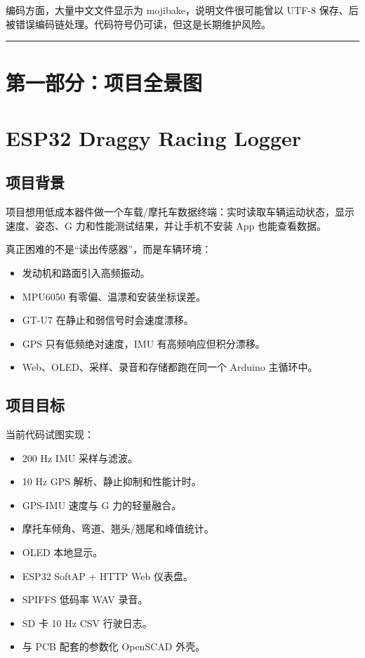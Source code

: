 \documentclass[
  UTF8,11pt,a4paper]{ctexart}
\providecommand{\tightlist}{%
  \setlength{\itemsep}{0pt}\setlength{\parskip}{0pt}}
\begin{document}
编码方面，大量中文文件显示为 mojibake，说明文件很可能曾以 UTF-8
保存、后被错误编码链处理。代码符号仍可读，但这是长期维护风险。

\begin{center}\rule{0.5\linewidth}{0.5pt}\end{center}

\section{第一部分：项目全景图}\label{ux7b2cux4e00ux90e8ux5206ux9879ux76eeux5168ux666fux56fe}

\section{ESP32 Draggy Racing Logger}\label{esp32-draggy-racing-logger}

\subsection{项目背景}\label{ux9879ux76eeux80ccux666f}

项目想用低成本器件做一个车载/摩托车数据终端：实时读取车辆运动状态，显示速度、姿态、G
力和性能测试结果，并让手机不安装 App 也能查看数据。

真正困难的不是``读出传感器''，而是车辆环境：

\begin{itemize}
\tightlist
\item
  发动机和路面引入高频振动。
\item
  MPU6050 有零偏、温漂和安装坐标误差。
\item
  GT-U7 在静止和弱信号时会速度漂移。
\item
  GPS 只有低频绝对速度，IMU 有高频响应但积分漂移。
\item
  Web、OLED、采样、录音和存储都跑在同一个 Arduino 主循环中。
\end{itemize}

\subsection{项目目标}\label{ux9879ux76eeux76eeux6807}

当前代码试图实现：

\begin{itemize}
\tightlist
\item
  200 Hz IMU 采样与滤波。
\item
  10 Hz GPS 解析、静止抑制和性能计时。
\item
  GPS-IMU 速度与 G 力的轻量融合。
\item
  摩托车倾角、弯道、翘头/翘尾和峰值统计。
\item
  OLED 本地显示。
\item
  ESP32 SoftAP + HTTP Web 仪表盘。
\item
  SPIFFS 低码率 WAV 录音。
\item
  SD 卡 10 Hz CSV 行驶日志。
\item
  与 PCB 配套的参数化 OpenSCAD 外壳。
\end{itemize}
\end{document}
